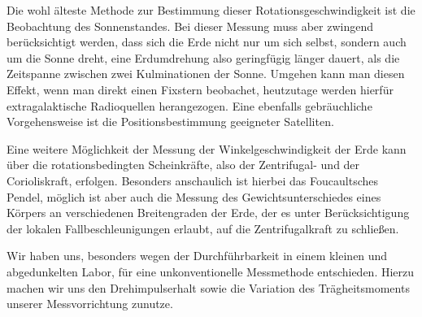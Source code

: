 \documentclass[halfparskip, 11pt]{scrartcl}
\begin{document}
Die wohl älteste Methode zur Bestimmung dieser Rotationsgeschwindigkeit ist die Beobachtung des Sonnenstandes.
Bei dieser Messung muss aber zwingend berücksichtigt werden, dass sich die Erde nicht nur um sich selbst, sondern auch um die Sonne dreht, eine Erdumdrehung also geringfügig länger dauert, als die Zeitspanne zwischen zwei Kulminationen der Sonne. Umgehen kann man diesen Effekt, wenn man direkt einen Fixstern beobachet, heutzutage werden hierfür extragalaktische Radioquellen herangezogen. Eine ebenfalls gebräuchliche Vorgehensweise ist die Positionsbestimmung geeigneter Satelliten.

Eine weitere Möglichkeit der Messung der Winkelgeschwindigkeit der Erde kann über die rotationsbedingten Scheinkräfte, also der Zentrifugal- und der Corioliskraft, erfolgen. Besonders anschaulich ist hierbei das Foucaultsches Pendel, möglich ist aber auch die Messung des Gewichtsunterschiedes eines Körpers an verschiedenen Breitengraden der Erde, der es unter Berücksichtigung der lokalen Fallbeschleunigungen erlaubt, auf die Zentrifugalkraft zu schließen. 

Wir haben uns, besonders wegen der Durchführbarkeit in einem kleinen und abgedunkelten Labor, für eine unkonventionelle Messmethode entschieden. Hierzu machen wir uns den Drehimpulserhalt sowie die Variation des Tr\"agheitsmoments unserer Messvorrichtung zunutze.
\end{document}
